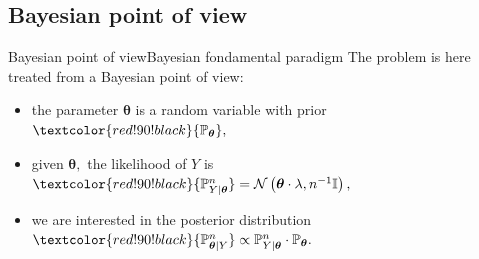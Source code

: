 \documentclass[10pt]{beamer}
\begin{document}
\subsection{Bayesian point of view}
\begin{frame}{Bayesian point of view}{Bayesian fondamental paradigm}
The problem is here treated from a Bayesian point of view:
\begin{itemize}
\item<1-> the parameter $\boldsymbol{\theta}$ is a random variable with \textcolor{red!90!black}{prior} $\textcolor{red!90!black}{\mathbb{P}_{\boldsymbol{\theta}}},$
\item<2-> given $\boldsymbol{\theta},$ the \textcolor{red!90!black}{likelihood} of $Y$ is $\textcolor{red!90!black}{\mathbb{P}_{Y \vert \boldsymbol{\theta}}^{n}} = \mathcal{N}\left(\boldsymbol{\theta} \cdot \lambda, n^{-1} \mathbb{I}\right),$
\item<3-> we are interested in the \textcolor{red!90!black}{posterior distribution} $\textcolor{red!90!black}{\mathbb{P}_{\boldsymbol{\theta} \vert Y}^{n}} \propto \mathbb{P}_{Y \vert \boldsymbol{\theta}}^{n} \cdot \mathbb{P}_{\boldsymbol{\theta}}.$
\end{itemize}
\end{frame}
\end{document}
